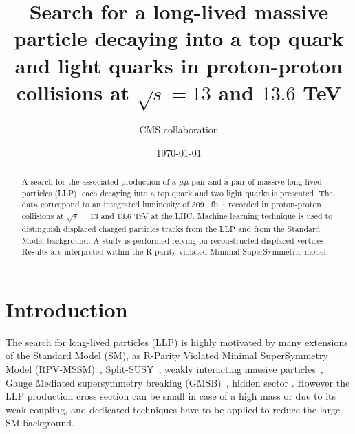\documentclass{cernatlasnote}
\title{\centering
Search for a long-lived massive particle decaying into a top quark and light quarks in proton-proton collisions at $\sqrt{s} = 13$ and $13.6$ TeV
}
\author{CMS collaboration}
\date{\today}
\newcommand{\fbinv}{\! fb$^{-1}$\xspace}
\begin{document}
\maketitle

\begin{abstract}

A search for the associated production of a $\mu\mu$ pair and a pair of massive long-lived particles (LLP), each decaying into a top quark and two light quarks is presented. The data correspond to an integrated luminosity of 309~\fbinv recorded in proton-proton collisions at $\sqrt{s} = 13$ and $13.6$ TeV at the LHC. Machine learning technique is used to distinguish displaced charged particles tracks from the LLP and from the Standard Model background. A study is performed relying on reconstructed displaced vertices. Results are interpreted within the R-parity violated Minimal SuperSymmetric model. 
\end{abstract}

\vfill
\makereviewtable
\clearpage



\section{Introduction}
\label{SEC: INTRO}
The search for long-lived particles (LLP) is highly motivated by many extensions of the Standard Model (SM), as R-Parity Violated Minimal SuperSymmetry Model (RPV-MSSM)~\cite{RPV1, RPV2, RPV3, RPV4}, Split-SUSY~\cite{SPLITSUSY, SPLITSUSY2, SPLITSUSY3, SPLITSUSY4, SPLITSUSY5, SPLITSUSY6}, weakly interacting massive particles~\cite{WIMP1,WIMP2,WIMP3}, Gauge Mediated supersymmetry breaking (GMSB)~\cite{GMSB1,GMSB2, GMSB3}, hidden sector \cite{HS1, HS2, HS3}. However the LLP production cross section can be small in case of a high mass or due to its weak coupling, and dedicated techniques have to be applied to reduce the large SM background.
\end{document}
